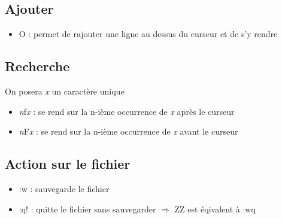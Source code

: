 \documentclass{article}
\begin{document}
\subsection{Ajouter}
\begin{itemize}
    \item O : permet de rajouter une ligne au dessus du curseur et de s'y rendre
\end{itemize}





\subsection{Recherche}
On posera \textit{x} un caractère unique
\begin{itemize}
    \item \textit{n}f\textit{x} : se rend sur la n-ième occurrence de \textit{x} après le curseur
    \item \textit{n}F\textit{x} : se rend sur la n-ième occurrence de \textit{x} avant le curseur
\end{itemize}




\subsection{Action sur le fichier}
\begin{itemize}
    \item :w : sauvegarde le fichier
    \item :q! : quitte le fichier sans sauvegarder\newline
    $\Longrightarrow$ ZZ est éqivalent à :wq

\end{itemize}
\end{document}
